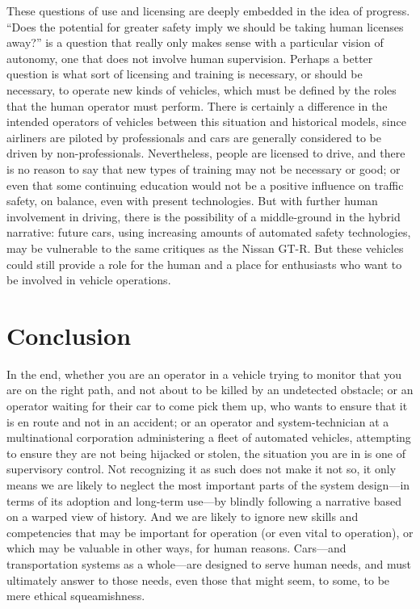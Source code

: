These questions of use and licensing are deeply embedded in the idea
of progress. ``Does the potential for greater safety imply we should be
taking human licenses away?'' is a question that really only makes
sense with a particular vision of autonomy, one that does not involve
human supervision. Perhaps a better question is what sort of licensing
and training is necessary, or should be necessary, to operate new
kinds of vehicles, which must be defined by the roles that the human
operator must perform. There is certainly a difference in the intended
operators of vehicles between this situation and historical models,
since airliners are piloted by professionals
and cars are generally considered to be driven by non-professionals.
Nevertheless, people are licensed to drive, and there is no reason to
say that new types of training may not be necessary or good;
or even that some continuing education would not be a positive
influence on traffic safety, on balance, even with present
technologies. But with further human involvement in driving, there is
the possibility of a
middle-ground in the hybrid narrative:  future cars, using increasing
amounts of automated safety technologies,
may be vulnerable to the same critiques as the Nissan GT-R. But these
vehicles could still provide a role for the human and a place for
enthusiasts who want to be involved in vehicle operations.

\section{Conclusion}

In the end, whether you are an operator in a vehicle trying to monitor that you
are on the right path, and not about to be killed by an undetected
obstacle; or an operator waiting
for their car to come pick them up, who wants to ensure that it is en route
and not in an accident; or an operator and system-technician at a
multinational corporation administering a fleet of automated vehicles,
attempting to ensure they are not being 
hijacked or stolen, the situation you are in is one of supervisory
control. Not recognizing it as such does not make it not so, it only means we are
likely to neglect the most important parts of the system design---in
terms of its adoption and long-term use---by blindly following a
narrative based on a warped view of history. And we are likely to
ignore new skills and competencies that may be important for
operation (or even vital to operation), or which may be valuable in other ways, for
human reasons. Cars---and transportation systems as a whole---are
designed to serve human needs, and must ultimately answer to those
needs, even those that might seem, to some, to be mere ethical squeamishness.


